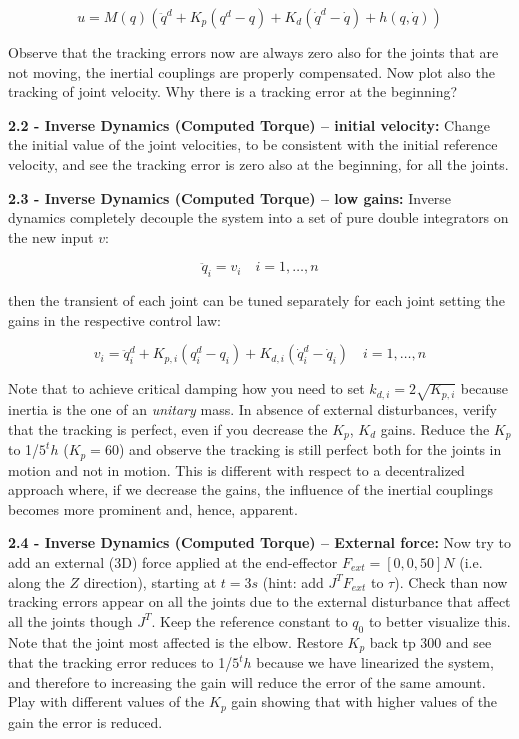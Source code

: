 \documentclass[11pt]{article}
\begin{document}
\begin{equation*}
u = M(q) (\ddot{q}^d + K_{p} (q^d  - q) + K_{d} (\dot{q}^d  - \dot{q}) + h(q,\dot{q}))
\end{equation*}

Observe that the tracking errors  now are  always zero also for the joints that are not moving, 
the inertial couplings are properly compensated. 
Now plot also the tracking of joint velocity. Why there is a tracking error at the beginning? 

\quad

\noindent
\textbf{ 2.2 - Inverse Dynamics (Computed Torque) – initial velocity:}
Change the initial value of the joint velocities, to be consistent with the initial reference velocity, and see the tracking error is zero also at the beginning, for all the joints. 

\quad

\noindent
\textbf{ 2.3 - Inverse Dynamics (Computed Torque) – low gains:}
Inverse dynamics completely decouple the system into a set of pure double integrators on the new input $v$:

\begin{equation*}
\ddot{q}_i = v_i  \quad i = 1, \dots, n
\end{equation*}

then the transient of each joint can be tuned separately for each joint setting the gains in the respective  control law:

\begin{equation*}
v_i  = \ddot{q}^d_i + K_{p,i} (q^d_i  - q_i) + K_{d,i} (\dot{q}^d_i  - \dot{q}_i) \quad i = 1, \dots, n
\end{equation*}

Note that to achieve critical damping how you need to set $k_{d,i} = 2\sqrt{K_{p,i}}$ because inertia is the one of an \textit{unitary} mass.
In absence of external disturbances, verify that the tracking is perfect, 
even if you decrease the $K_p$, $K_d$ gains.  Reduce the $K_p$ to 1/$5^th$ ($K_p = 60$) and observe the tracking is still perfect both for the joints in motion and not in motion. This is different with respect to a decentralized approach where, if we decrease the gains,  the influence of the inertial couplings becomes more  prominent and, hence, apparent.   

\quad

\noindent
\textbf{2.4 - Inverse Dynamics (Computed Torque) – External force:} 
Now try to add an external (3D) force applied at the end-effector $F_{ext} =[0,0,50] N$ (i.e. along the $Z$ direction),
starting at $t= 3s$ (hint: add  $J^TF_{ext}$ to $\tau$). Check than now tracking errors appear on all the joints due to the external disturbance that affect all the joints though  $J^T$. Keep the  reference  constant to $q_0$ to better visualize this. Note that the joint most affected is the elbow.
Restore $K_p$ back tp $300$ and see that the tracking error reduces to 1/$5^th$ because we have linearized the system, and therefore to increasing the gain will reduce the error of the same amount. 
Play with different values of the  $K_p$ gain showing that with higher values of the gain the error is reduced.
\end{document}
